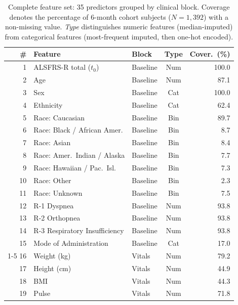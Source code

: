 \begin{table}[ht!]
\centering
\caption[Complete feature set by clinical block]{Complete feature set: 35 predictors grouped by clinical block.
Coverage denotes the percentage of 6-month cohort subjects ($N\!=\!1{,}392$) with a non-missing value.
\textit{Type} distinguishes numeric features (median-imputed) from categorical features (most-frequent imputed, then one-hot encoded).}
\label{tab:feature_summary}
\footnotesize
\begin{tabular}{r l l c r}
\toprule
\# & Feature & Block & Type & Cover.\ (\%) \\
\midrule
 1 & ALSFRS-R total ($t_0$)       & Baseline & Num & 100.0 \\
 2 & Age                           & Baseline & Num &  87.1 \\
 3 & Sex                           & Baseline & Cat & 100.0 \\
 4 & Ethnicity                     & Baseline & Cat &  62.4 \\
 5 & Race: Caucasian               & Baseline & Bin &  89.7 \\
 6 & Race: Black / African Amer.   & Baseline & Bin &   8.7 \\
 7 & Race: Asian                   & Baseline & Bin &   8.4 \\
 8 & Race: Amer.\ Indian / Alaska  & Baseline & Bin &   7.7 \\
 9 & Race: Hawaiian / Pac.\ Isl.   & Baseline & Bin &   7.3 \\
10 & Race: Other                   & Baseline & Bin &   2.3 \\
11 & Race: Unknown                 & Baseline & Bin &   7.5 \\
12 & R-1 Dyspnea                   & Baseline & Num &  93.8 \\
13 & R-2 Orthopnea                 & Baseline & Num &  93.8 \\
14 & R-3 Respiratory Insufficiency  & Baseline & Num &  93.8 \\
15 & Mode of Administration         & Baseline & Cat &  17.0 \\
\cmidrule{1-5}
16 & Weight (kg)                    & Vitals   & Num &  79.2 \\
17 & Height (cm)                    & Vitals   & Num &  44.9 \\
18 & BMI                            & Vitals   & Num &  44.3 \\
19 & Pulse                          & Vitals   & Num &  71.8 \\

\end{tabular}
\end{table}
